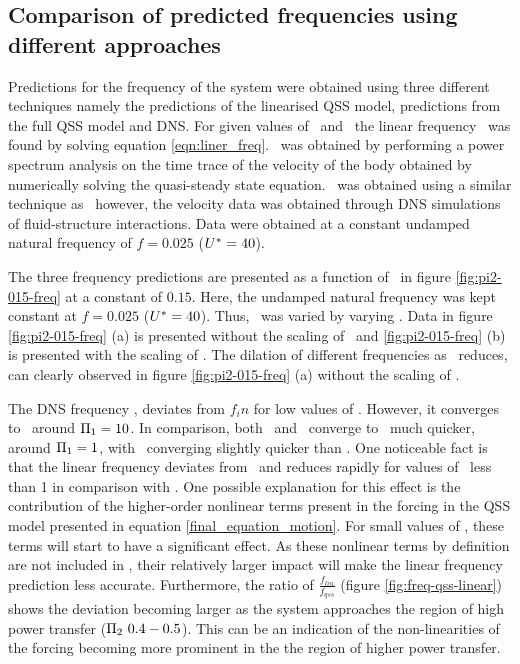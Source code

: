 \subsection{Comparison of predicted frequencies using different approaches}

Predictions for the frequency of the system were obtained using three different techniques namely the predictions of the linearised QSS model, predictions from the full QSS model and DNS. For given values of \massstiff\ and \massdamp\, the linear frequency \freqlin\ was found by solving equation \ref{eqn:liner_freq}. \freqqss\ was obtained by performing a power spectrum analysis on the time trace of the velocity of the body  obtained by numerically solving the quasi-steady state equation. \freqdns\ was obtained using a similar technique as \freqqss\ however, the velocity data was obtained through DNS simulations of fluid-structure interactions. Data were obtained at a constant undamped natural frequency of $f=0.025$ ($U^{*}=40$).



The three frequency predictions are presented as a function of  \massstiff\ in figure \ref{fig:pi2-015-freq} at a constant \massdamp of $0.15$. Here, the undamped natural frequency was kept constant at $f=0.025$ ($U^{*}=40$). Thus, \massstiff\ was varied by varying \mstar. Data in figure \ref{fig:pi2-015-freq} (a) is presented without the scaling of \mstar\ and \ref{fig:pi2-015-freq} (b) is presented with the scaling of \mstar. The dilation of different frequencies as \massstiff\ reduces, can clearly observed in figure \ref{fig:pi2-015-freq} (a) without the scaling of \mstar.

The DNS frequency \freqdns, deviates from $f_in$ for low values of \massstiff. However, it converges to \freqinput\ around $\Pi_1=10$. In comparison, both \freqlin\ and \freqqss\ converge to \freqinput\ much quicker, around $\Pi_1 = 1$, with \freqlin\ converging slightly quicker than \freqqss. One noticeable fact is that the linear frequency deviates from \freqinput\ and reduces rapidly for values of \massstiff\ less than 1 in comparison with \freqqss. One possible explanation for this effect is the contribution of the higher-order nonlinear terms present in the forcing in the QSS model presented in equation \ref{final_equation_motion}. For small values of \massstiff, these terms will start to have a significant effect. As these nonlinear terms by definition are not included in \freqlin, their relatively larger impact will make the linear frequency prediction less accurate. Furthermore, the ratio of $\frac{f_{lin}}{f_{qss}}$ (figure \ref{fig:freq-qss-linear}) shows the deviation becoming larger as the system approaches the region of high power transfer ($\massdamp\ 0.4-0.5$). This can be an indication of the non-linearities of the forcing becoming more prominent in the the region of higher power transfer.

